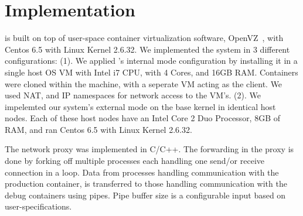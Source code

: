 
\section{Implementation}
\label{sec:implementation}

\parikshan is built on top of user-space container virtualization software, OpenVZ~\cite{openvz}, with Centos 6.5 with Linux Kernel 2.6.32.
We implemented the system in 3 different configurations: 
(1). We applied \parikshan 's internal mode configuration by installing it in a single host OS VM with Intel i7 CPU, with 4 Cores, and 16GB RAM. 
Containers were cloned within the machine, with a seperate VM acting as the client.
We used NAT, and IP namespaces for network access to the VM's.
(2). We impelemted our system's external mode on the base kernel in identical host nodes. 
Each of these host nodes have an Intel Core 2 Duo Processor, 8GB of RAM, and ran Centos 6.5 with Linux Kernel 2.6.32.

The network proxy was implemented in C/C++.
The forwarding in the proxy is done by forking off multiple processes each handling one send/or receive connection in a loop.
Data from processes handling communication with the production container, is  transferred to those handling communication with the debug containers using pipes.
Pipe buffer size is a configurable input based on user-specifications. 